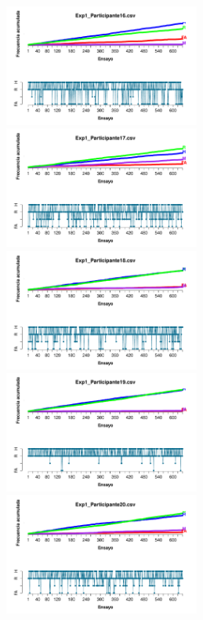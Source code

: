\documentclass[a4paper ]{article}
\begin{document}
\begin{figure}[th]
\begin{center}
\includegraphics[width=8cm, height=4cm]{Figures/Outcome_Exp1_P16} \includegraphics[width=8cm, height=4cm]{Figures/Outcome_Exp1_P17} \includegraphics[width=8cm, height=4cm]{Figures/Outcome_Exp1_P18}
\includegraphics[width=8cm, height=4cm]{Figures/Outcome_Exp1_P19} \includegraphics[width=8cm, height=4cm]{Figures/Outcome_Exp1_P20} 
\end{center}
\end{figure}
\clearpage
\end{document}
